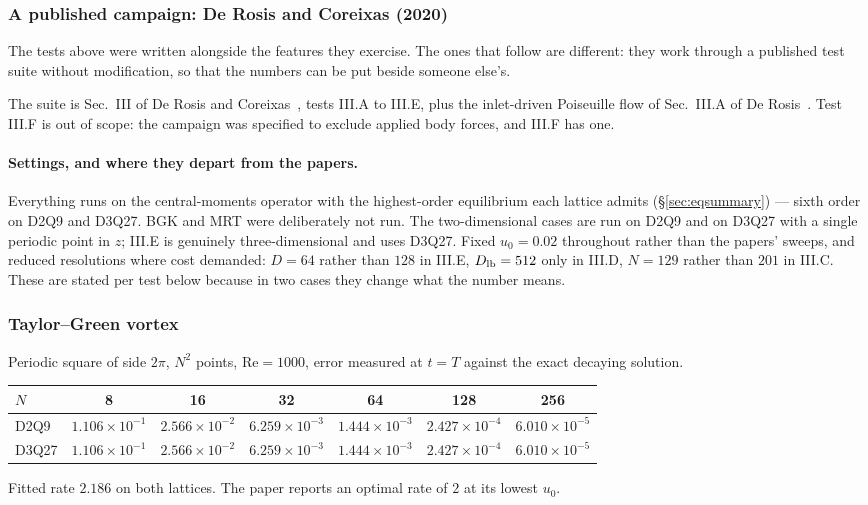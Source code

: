 \documentclass[11pt,a4paper]{article}
\newcommand{\e}[1]{\times 10^{#1}}
\begin{document}
\subsubsection{A published campaign: De Rosis and Coreixas (2020)}
\label{sec:campaign}

The tests above were written alongside the features they exercise. The ones
that follow are different: they work through a published test suite without
modification, so that the numbers can be put beside someone else's.

The suite is Sec.~III of De Rosis and Coreixas~\cite{derosis2020}, tests III.A
to III.E, plus the inlet-driven Poiseuille flow of Sec.~III.A of De
Rosis~\cite{derosis2017pre}. Test III.F is out of scope: the campaign was
specified to exclude applied body forces, and III.F has one.

\paragraph{Settings, and where they depart from the papers.} Everything runs on
the central-moments operator with the highest-order equilibrium each lattice
admits (\S\ref{sec:eqsummary}) --- sixth order on D2Q9 and D3Q27. BGK and MRT
were deliberately not run. The two-dimensional cases are run on D2Q9 and on
D3Q27 with a single periodic point in $z$; III.E is genuinely
three-dimensional and uses D3Q27. Fixed $u_0=0.02$
throughout rather than the papers' sweeps, and reduced resolutions where cost
demanded: $D=64$ rather than $128$ in III.E, $D_{\rm lb}=512$ only in III.D,
$N=129$ rather than $201$ in III.C. These are stated per test below because in
two cases they change what the number means.

\subsubsection{Taylor--Green vortex}

Periodic square of side $2\pi$, $N^2$ points, $\mathrm{Re}=1000$, error measured
at $t=T$ against the exact decaying solution.

\begin{center}\small
\begin{tabular}{lcccccc}
\toprule
$N$ & 8 & 16 & 32 & 64 & 128 & 256 \\
\midrule
D2Q9  & $1.106\e{-1}$ & $2.566\e{-2}$ & $6.259\e{-3}$ & $1.444\e{-3}$ & $2.427\e{-4}$ & $6.010\e{-5}$ \\
D3Q27 & $1.106\e{-1}$ & $2.566\e{-2}$ & $6.259\e{-3}$ & $1.444\e{-3}$ & $2.427\e{-4}$ & $6.010\e{-5}$ \\
\bottomrule
\end{tabular}
\end{center}
\noindent Fitted rate $2.186$ on both lattices. The paper
reports an optimal rate of $2$ at its lowest $u_0$.
\end{document}
